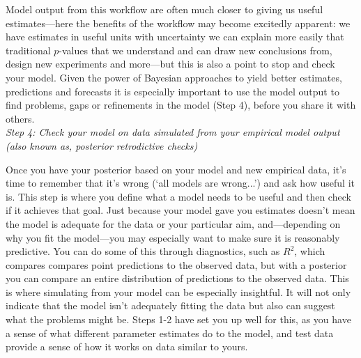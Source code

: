 \documentclass[11pt]{article}
\begin{document}
Model output from this workflow are often much closer to giving us useful estimates---here the benefits of the workflow may become excitedly apparent: we have estimates in useful units with uncertainty we can explain more easily that traditional $p$-values that we understand and can draw new conclusions from, design new experiments and more---but this is also a point to stop and check your model. Given the power of Bayesian approaches to yield better estimates, predictions and forecasts it is especially important to use the model output to find problems, gaps or refinements in the model (Step 4), before you share it with others.  \\

\emph{Step 4: Check your model on data simulated from your empirical model output (also known as, posterior retrodictive checks)} 

Once you have your posterior based on your model and new empirical data, it's time to remember that it's wrong (`all models are wrong...') and ask how useful it is. This step is where you define what a model needs to be useful and then check if it achieves that goal. Just because your model gave you estimates doesn't mean the model is adequate for the data or your particular aim, and---depending on why you fit the model---you may especially want to make sure it is reasonably predictive. You can do some of this through diagnostics, such as $R^2$, which compares compares point predictions to the observed  data, but with a posterior you can compare an entire distribution of predictions to the observed data. This is where simulating from your model can be especially insightful. It will not only indicate that the model isn't adequately fitting the data but also can suggest what the problems might be. Steps 1-2 have set you up well for this, as you have a sense of what different parameter estimates do to the model, and test data provide a sense of how it works on data similar to yours.
\end{document}
